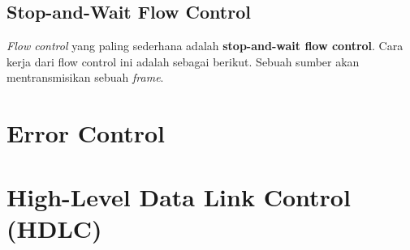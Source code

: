 \subsection{Stop-and-Wait Flow Control}

\textit{Flow control} yang paling sederhana adalah \textbf{stop-and-wait flow control}. Cara kerja dari flow control ini adalah sebagai berikut. Sebuah sumber akan mentransmisikan sebuah \textit{frame}.

\section{Error Control}


\section{High-Level Data Link Control (HDLC)}
